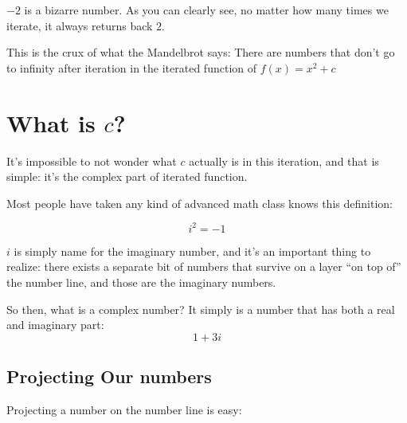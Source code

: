 \documentclass{article}
\begin{document}
$-2$ is a bizarre number.  As you can clearly see, no matter how many times we iterate, it always returns back $2$.

This is the crux of what the Mandelbrot says: There are numbers that don't go to infinity after iteration in the iterated function of $f(x) = x^2 + c$

\section{What is $c$?}
It's impossible to not wonder what $c$ actually is in this iteration, and that is simple: it's the complex part of iterated function.

Most people have taken any kind of advanced math class knows this definition:

$$ i^2 = -1$$

$i$ is simply name for the imaginary number, and it's an important thing to realize: there exists a separate bit of numbers that survive on a layer ``on top of'' the number line, and those are the imaginary numbers.

So then, what is a complex number?  It simply is a number that has both a real and imaginary part:
$$ 1 + 3i$$


\subsection{Projecting Our numbers}
Projecting a number on the number line is easy:

\end{document}
